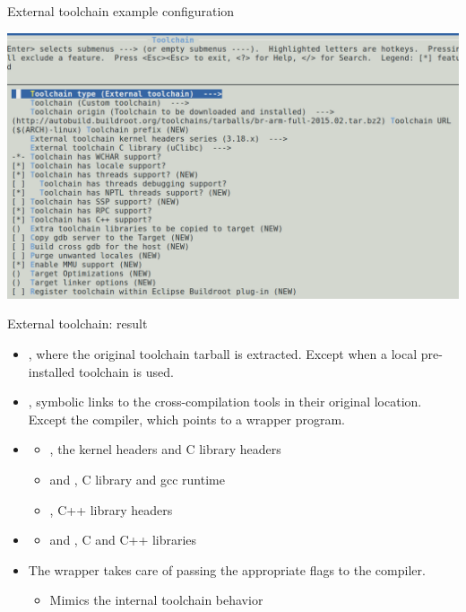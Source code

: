 \begin{frame}{External toolchain example configuration}
  \begin{center}
    \includegraphics[width=\textwidth]{slides/buildroot-toolchain/external-toolchain-config.png}
  \end{center}
\end{frame}

\begin{frame}{External toolchain: result}
  \begin{itemize}
  \item {}, where the original toolchain
    tarball is extracted. Except when a local pre-installed toolchain
    is used.
  \item {}, symbolic links to the
    cross-compilation tools in their original location. Except the
    compiler, which points to a wrapper program.
  \item {}
    \begin{itemize}
    \item {}, the kernel headers and C
      library headers
    \item {} and , C library and
      gcc runtime
    \item {}, C++ library headers
    \end{itemize}
  \item {}
    \begin{itemize}
    \item {} and , C and C++ libraries
    \end{itemize}
  \item The wrapper takes care of passing the appropriate flags to the
    compiler.
    \begin{itemize}
    \item Mimics the internal toolchain behavior
    \end{itemize}
  \end{itemize}
\end{frame}

